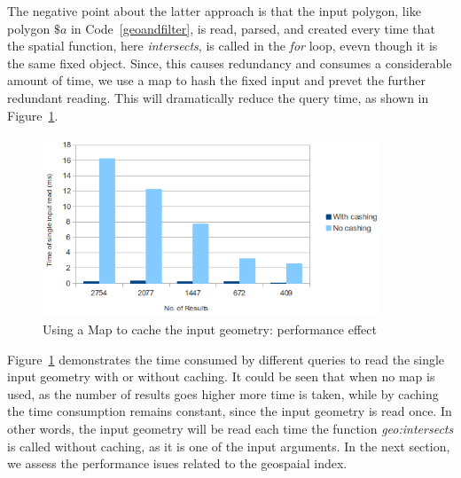 \documentclass[a4paper,12pt]{article}
\begin{document}
The negative point about the latter approach is that the input polygon, like polygon $\$a$ in Code~\ref{geoandfilter}, is read, parsed, and created every time that the spatial function, here \textit{intersects}, is called in the \textit{for} loop, evevn though it is the same fixed object. Since, this causes redundancy and consumes a considerable amount of time, we use a map to hash the fixed input and prevet the further redundant reading. This will dramatically reduce the query time, as shown in Figure~\ref{figMap}.
 \begin{figure}
\centering
\includegraphics[width=0.9\textwidth]{MapIndexing}
\caption{Using a Map to cache the input geometry: performance effect}
\label{figMap}
\end{figure}

Figure~\ref{figMap} demonstrates the time consumed by different queries to read the single input geometry with or without caching. It could be seen that when no map is used, as the number of results goes higher more time is taken, while by caching the time consumption remains constant, since the input geometry is read once. In other words, the input geometry will be read each time the function \textit{geo:intersects} is called without caching, as it is one of the input arguments. In the next section, we assess the performance isues related to the geospaial index.
\end{document}
